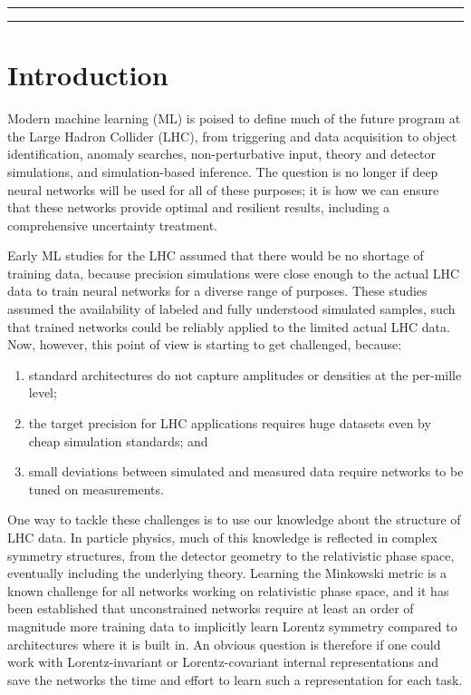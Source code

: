 \documentclass[submission, Phys]{SciPost}
\begin{document}

\vspace{10pt}
\noindent\rule{\textwidth}{1pt}
\tableofcontents\thispagestyle{fancy}
\noindent\rule{\textwidth}{1pt}
\vspace{10pt}

\newpage
\section{Introduction}
\label{sec:intro}

Modern machine learning (ML) is poised to define much of the future program at the Large Hadron Collider (LHC), from triggering and data acquisition to object identification, anomaly searches, non-perturbative input, theory and detector simulations, and simulation-based inference. The question is no longer if deep neural networks will be used for all of these purposes; it is how we can ensure that these networks provide optimal and resilient results, including a comprehensive uncertainty treatment.

Early ML studies for the LHC assumed that there would be no shortage of training data, because precision simulations were close enough to the actual LHC data to train neural networks for a diverse range of purposes.
%
These studies assumed the availability of labeled and fully understood simulated samples, such that trained networks could be reliably applied to the limited actual LHC data.
%
Now, however, this point of view is starting to get challenged, because:
%
\begin{enumerate}
\item standard architectures do not capture amplitudes or densities at the per-mille level; 
\item the target precision for LHC applications requires huge datasets even by cheap simulation standards; and
\item small deviations between simulated and measured data require networks to be tuned on measurements.
\end{enumerate}
%
One way to tackle these challenges is to use our knowledge about the structure of LHC data. In particle physics, much of this knowledge is reflected in complex symmetry structures, from the detector geometry to the relativistic phase space, eventually including the underlying theory. Learning the Minkowski metric is a known challenge for all networks working on relativistic phase space, and it has been established that unconstrained networks require at least an order of magnitude more training data to implicitly learn Lorentz symmetry compared to architectures where it is built in. An obvious question is therefore if one could work with Lorentz-invariant or Lorentz-covariant internal representations and save the networks the time and effort to learn such a representation for each task.
\end{document}
